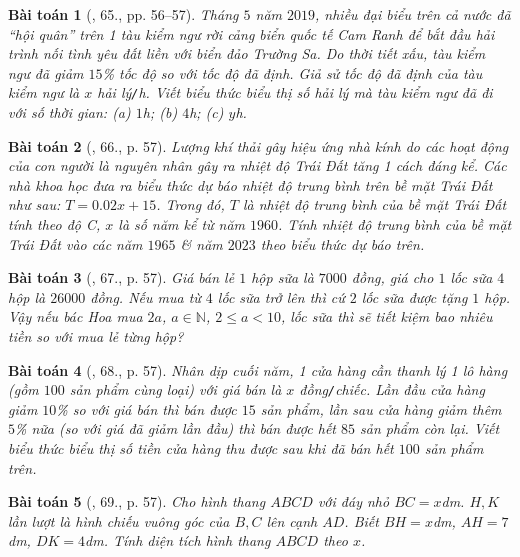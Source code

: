 \documentclass{article}
\newtheorem{baitoan}{Bài toán}
\begin{document}
\begin{baitoan}[\cite{SBT_Toan_7_Canh_Dieu_tap_2}, 65., pp. 56--57]
	Tháng $5$ năm $2019$, nhiều đại biểu trên cả nước đã ``hội quân'' trên 1 tàu kiểm ngư rời cảng biển quốc tế Cam Ranh để bắt đầu hải  trình nối tình yêu đất liền với biển đảo Trường Sa. Do thời tiết xấu, tàu kiểm ngư đã giảm $15$\% tốc độ so với tốc độ đã định. Giả sử tốc độ đã định của tàu kiểm ngư là $x$ \emph{hải lý\texttt{/}h}. Viết biểu thức biểu thị số hải lý mà tàu kiểm ngư đã đi với số thời gian: (a) $1$\emph{h}; (b) $4$\emph{h}; (c) $y$\emph{h}.
\end{baitoan}

\begin{baitoan}[\cite{SBT_Toan_7_Canh_Dieu_tap_2}, 66., p. 57]
	Lượng khí thải gây hiệu ứng nhà kính do các hoạt động của con người là nguyên nhân gây ra nhiệt độ Trái Đất tăng 1 cách đáng kể. Các nhà khoa học đưa ra biểu thức dự báo nhiệt độ trung bình trên bề mặt Trái Đất như sau: $T = 0.02x + 15$. Trong đó, $T$ là nhiệt độ trung bình của bề mặt Trái Đất tính theo độ \emph{C}, $x$ là số năm kể từ năm $1960$. Tính nhiệt độ trung bình của bề mặt Trái Đất vào các năm $1965$ \& năm $2023$ theo biểu thức dự báo trên.
\end{baitoan}

\begin{baitoan}[\cite{SBT_Toan_7_Canh_Dieu_tap_2}, 67., p. 57]
	Giá bán lẻ $1$ hộp sữa là $7000$ đồng, giá cho $1$ lốc sữa $4$ hộp là $26000$ đồng. Nếu mua từ $4$ lốc sữa trở lên thì cứ $2$ lốc sữa được tặng $1$ hộp. Vậy nếu bác Hoa mua $2a$, $a\in\mathbb{N}$, $2\le a < 10$, lốc sữa thì sẽ tiết kiệm bao nhiêu tiền so với mua lẻ từng hộp?
\end{baitoan}

\begin{baitoan}[\cite{SBT_Toan_7_Canh_Dieu_tap_2}, 68., p. 57]
	Nhân dịp cuối năm, 1 cửa hàng cần thanh lý 1 lô hàng (gồm $100$ sản phẩm cùng loại) với giá bán là $x$ \emph{đồng\texttt{/}chiếc}. Lần đầu cửa hàng giảm $10$\% so với giá bán thì bán được $15$ sản phẩm, lần sau cửa hàng giảm thêm $5$\% nữa (so với giá đã giảm lần đầu) thì bán được hết $85$ sản phẩm còn lại. Viết biểu thức biểu thị số tiền cửa hàng thu được sau khi đã bán hết $100$ sản phẩm trên.
\end{baitoan}

\begin{baitoan}[\cite{SBT_Toan_7_Canh_Dieu_tap_2}, 69., p. 57]
	Cho hình thang $ABCD$ với đáy nhỏ $BC = x$\emph{dm}. $H,K$ lần lượt là hình chiếu vuông góc của $B,C$ lên cạnh $AD$. Biết $BH = x$\emph{dm}, $AH = 7$\emph{dm}, $DK = 4$\emph{dm}. Tính diện tích hình thang $ABCD$ theo $x$.
\end{baitoan}
\end{document}

